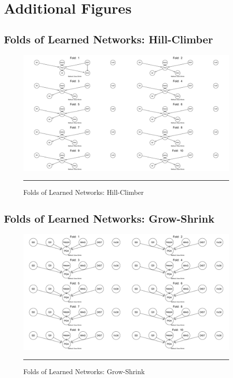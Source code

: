 \chapter{Additional Figures}

\newpage
\section{Folds of Learned Networks: Hill-Climber} %

\label{AppendixA1} %

\begin{figure}[!htbp]%
	\centering
		\includegraphics[angle=90,scale = 0.5]{Figures/hc.pdf}
		\rule{35em}{0.5pt}
	\caption*{Folds of Learned Networks: Hill-Climber}
\end{figure}

\newpage
\section{Folds of Learned Networks: Grow-Shrink} %

\label{AppendixA2} %

\begin{figure}[!htbp]%
	\centering
		\includegraphics[angle=90,scale=0.5]{Figures/gs.pdf}
		\rule{35em}{0.5pt}
	\caption*{Folds of Learned Networks: Grow-Shrink}
\end{figure}